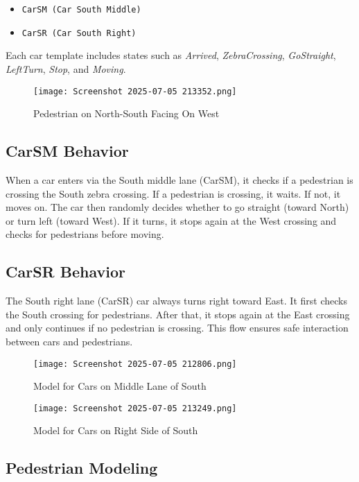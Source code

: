 \documentclass[conference]{IEEEtran}
\begin{document}
\begin{itemize}
    \item \texttt{CarSM (Car South Middle)}
    \item \texttt{CarSR (Car South Right)} \\
\end{itemize}


Each car template includes states such as \textit{Arrived}, \textit{ZebraCrossing}, \textit{GoStraight}, \textit{LeftTurn}, \textit{Stop}, and \textit{Moving}.

\begin{figure}
    \centering
    \texttt{[image: Screenshot 2025-07-05 213352.png]}
    \caption{Pedestrian on North-South Facing On West}
    \label{fig:enter-label}
\end{figure}


\subsection{CarSM Behavior}
When a car enters via the South middle lane (CarSM), it checks if a pedestrian is crossing the South zebra crossing. If a pedestrian is crossing, it waits. If not, it moves on. The car then randomly decides whether to go straight (toward North) or turn left (toward West). If it turns, it stops again at the West crossing and checks for pedestrians before moving.

\subsection{CarSR Behavior}
The South right lane (CarSR) car always turns right toward East. It first checks the South crossing for pedestrians. After that, it stops again at the East crossing and only continues if no pedestrian is crossing. This flow ensures safe interaction between cars and pedestrians.
\begin{figure*}
    \centering
    \texttt{[image: Screenshot 2025-07-05 212806.png]}
    \caption{Model for Cars on Middle Lane of South}
    \label{fig:enter-label}
\end{figure*}

\begin{figure*}
    \centering
    \texttt{[image: Screenshot 2025-07-05 213249.png]}
    \caption{Model for Cars on Right Side of South}
    \label{fig:enter-label}
\end{figure*}


\subsection{Pedestrian Modeling}
\end{document}
